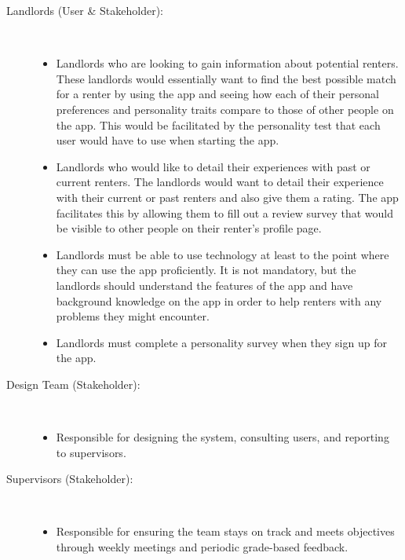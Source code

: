 \documentclass{article}
\begin{document}
\begin{description}
    \item[Landlords (User \& Stakeholder):]
    \newline \,
    \begin{itemize}
        \item Landlords who are looking to gain information about potential renters.  These 
        landlords would essentially want to find the best possible match for a renter by using the 
        app and seeing how each of their personal preferences and personality traits compare to 
        those of other people on the app. This would be facilitated by the personality test that 
        each user would have to use when starting the app. 
        \item Landlords who would like to detail their experiences with past or current renters. 
        The landlords would want to detail their experience with their current or past renters and 
        also give them a rating. The app facilitates this by allowing them to fill out a review 
        survey that would be visible to other people on their renter’s profile page.
        \item Landlords must be able to use technology at least to the point where they can use the
        app proficiently. It is not mandatory, but the landlords should understand the features of 
        the app and have background knowledge on the app in order to help renters with any problems
        they might encounter.
        \item Landlords must complete a personality survey when they sign up for the app. 
    \end{itemize}
    
    \item[Design Team (Stakeholder):]
    \newline \,
    \begin{itemize}
        \item Responsible for designing the system, consulting users, and reporting to supervisors.
    \end{itemize}
    
    \item[Supervisors (Stakeholder):]
    \newline \,
    \begin{itemize}
        \item Responsible for ensuring the team stays on track and meets objectives through weekly 
        meetings and periodic grade-based feedback.
    \end{itemize}
    
\end{description}
\end{document}
